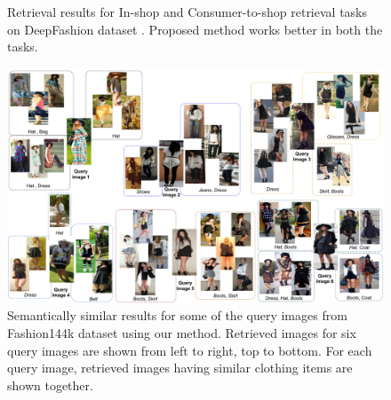 \documentclass{article}
\begin{document}
\begin{figure}%
    \centering
    \caption{Retrieval results for In-shop and Consumer-to-shop retrieval tasks on DeepFashion dataset \cite{LiuCVPR2016}. Proposed method works better in both the tasks.}
    \label{fig:retrieval_results}
\end{figure}

\begin{figure}[t]
\centering
\includegraphics[width=1.0\linewidth]{staqu_results}
\caption{Semantically similar results for some of the query images from Fashion144k dataset \cite{SimoSerraCVPR2016} using our method. Retrieved images for six query images are shown from left to right, top to bottom. For each query image, retrieved images having similar clothing items are shown together.}
\label{fig:results}
\end{figure}
\end{document}
